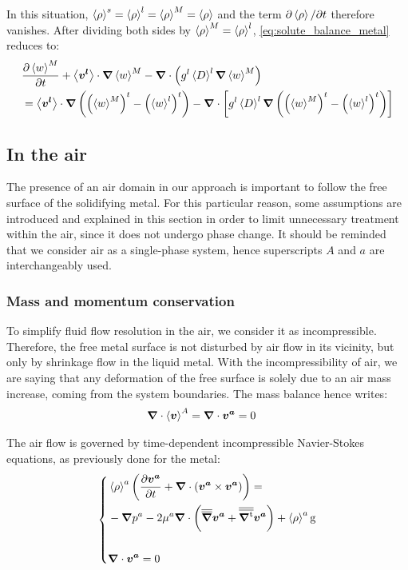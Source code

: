 In this situation, $\left \langle \rho \right \rangle^s=\left \langle \rho \right \rangle^l= \left \langle \rho \right \rangle^M= \left \langle \rho \right \rangle$ and the term $\partial \left \langle \rho \right \rangle/\partial t$ therefore vanishes.
After dividing both sides by $\left \langle \rho \right \rangle^M=\left \langle \rho \right \rangle^l$, \cref{eq:solute_balance_metal} reduces to:
\begin{align}
\label{eq:solute_balance_metal_incompressible}
 \begin{split}
      & \tempup{\avg{w}^M}  + \vit \cdot \nabvec \avg{w}^M - \nabvec \cdot \brac{\gl \Dl \nabvec \avg{w}^M} \\
	  & = \vit \cdot \nabvec \brac{\brac{\avg{w}^M}^t -\brac{\wl}^t}
	 - \nabvec \cdot \crochet{\gl \Dl \nabvec \brac{\brac{\avg{w}^M}^t -\brac{\wl}^t} } 
  \end{split}
\end{align}

\subsection{In the air}

The presence of an air domain in our approach is important to follow the free surface of the solidifying metal.
For this particular reason, some assumptions are introduced and explained in this section in order to limit unnecessary treatment within
the air, since it does not undergo phase change. It should be reminded that we consider air as a single-phase system, hence superscripts $A$ and $a$
are interchangeably used. 
 
\subsubsection{Mass and momentum conservation}

To simplify fluid flow resolution in the air, we consider it as incompressible.
Therefore, the free metal surface is not 
disturbed by air flow in its vicinity, but only by shrinkage flow in the liquid metal. With the incompressibility of air, we are saying that any deformation of the free surface 
is solely due to an air mass increase, coming from the system boundaries. The mass balance hence writes:
\begin{align}
\label{eq:mass_balance_air}
& \nabvec \cdot \vA = \nabvec \cdot \va = 0
\end{align}

The air flow is governed by time-dependent incompressible Navier-Stokes equations, as previously done for the metal:
\begin{equation}
\label{eq:momentum_balance_air}
   \left\{
   \begin{aligned}
      & \rhoa \brac{\tempup{ \va } + \nabvec \cdot \brac{\va \times \va}} = \\
	  &- \nabvec \pa - 2 \mua \nabvec \cdot \brac{\nabmat \va + \nabmattransp \va}
	   + \rhoa \gravity\\ \\
      & \nabvec \cdot \va = 0
    \end{aligned}
    \right.
\end{equation}


